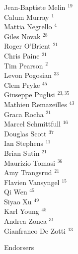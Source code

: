 \documentclass[PICOReport.tex]{subfiles}
\begin{document}
{\begin{multicols}{4}
Jean-Baptiste Melin $^{19}$             \\
Calum Murray $^{1}$                    \\
Mattia Negrello $^{4}$                 \\
Giles Novak $^{28}$                     \\
Roger O'Brient $^{21}$                  \\
Chris Paine $^{21}$                     \\
Tim Pearson $^{2}$                     \\
Levon Pogosian $^{33}$                  \\
Clem Pryke $^{45}$                      \\
Giuseppe Puglisi $^{23,35}$                \\
Mathieu Remazeilles $^{43}$             \\
Graca Rocha $^{21}$                     \\
Marcel Schmittfull $^{16}$              \\
Douglas Scott $^{37}$                   \\
Ian Stephens $^{11}$                    \\
Brian Sutin $^{21}$                     \\
Maurizio Tomasi $^{36}$                 \\
Amy Trangsrud $^{21}$                   \\
Flavien Vansyngel $^{15}$               \\
Qi Wen $^{45}$                          \\
Siyao Xu $^{49}$                        \\
Karl Young $^{45}$                      \\
Andrea Zonca $^{31}$                    \\
Gianfranco De Zotti $^{13}$             
\end{multicols}
}

\Large { \centerline {Endorsers}}
\end{document}
